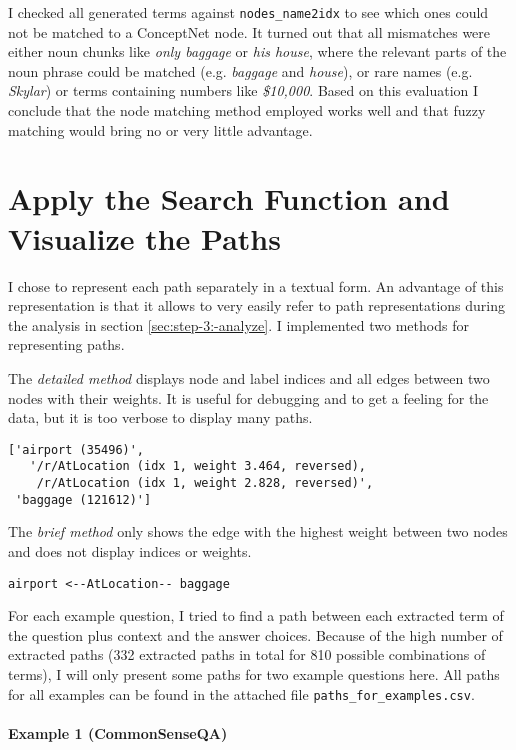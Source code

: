 \documentclass{article}
\begin{document}
I checked all generated terms against \verb|nodes_name2idx| to see
which ones could not be matched to a ConceptNet node.  It turned out
that all mismatches were either noun chunks like \emph{only baggage}
or \emph{his house}, where the relevant parts of the noun phrase could
be matched (e.g. \emph{baggage} and \emph{house}), or rare names
(e.g. \emph{Skylar}) or terms containing numbers like \emph{\$10,000}. Based
on this evaluation I conclude that the node matching method employed
works well and that fuzzy matching would bring no or very little
advantage.

\section{Apply the Search Function and Visualize the Paths}
\label{sec:step-2:-use}

I chose to represent each path separately in a textual form. An
advantage of this representation is that it allows to very easily
refer to path representations during the analysis in
section \ref{sec:step-3:-analyze}.  I implemented two methods for
representing paths.

The \emph{detailed method} displays node and label indices and all edges
between two nodes with their weights. It is useful for debugging and
to get a feeling for the data, but it is too verbose to display many
paths.

\begin{verbatim}
['airport (35496)',
   '/r/AtLocation (idx 1, weight 3.464, reversed),
    /r/AtLocation (idx 1, weight 2.828, reversed)',
 'baggage (121612)']
\end{verbatim}

The \emph{brief method} only shows the edge with the highest weight
between two nodes and does not display indices or weights.

\begin{verbatim}
airport <--AtLocation-- baggage
\end{verbatim}

For each example question, I tried to find a path between each
extracted term of the question plus context and the answer
choices.   Because of the high number of extracted paths (332 extracted
paths in total for 810 possible combinations of terms), I will only
present some paths for two example questions here. All paths for all
examples can be found in the attached file
\verb|paths_for_examples.csv|.


\paragraph{Example 1 (CommonSenseQA)}
\end{document}
